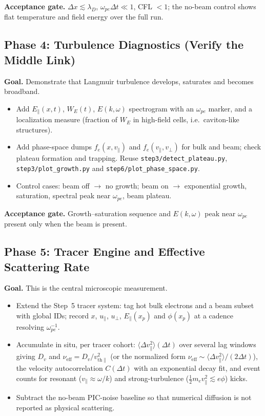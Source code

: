 \documentclass[11pt,a4paper]{article}
\begin{document}
\textbf{Acceptance gate.} $\Delta x\lesssim\lambda_D$, $\omega_{pe}\Delta t\ll1$, CFL $<1$; the
no-beam control shows flat temperature and field energy over the full run.

\subsection{Phase 4: Turbulence Diagnostics (Verify the Middle Link)}

\textbf{Goal.} Demonstrate that Langmuir turbulence develops, saturates and becomes broadband.

\begin{itemize}[leftmargin=*]
  \item Add $E_\parallel(x,t)$, $W_E(t)$, $E(k,\omega)$ spectrogram with an $\omega_{pe}$ marker,
        and a localization measure (fraction of $W_E$ in high-field cells, i.e.\ caviton-like
        structures).
  \item Add phase-space dumps $f_e(x,v_\parallel)$ and $f_e(v_\parallel,v_\perp)$ for bulk and
        beam; check plateau formation and trapping. Reuse \texttt{step3/detect\_plateau.py},
        \texttt{step3/plot\_growth.py} and \texttt{step6/plot\_phase\_space.py}.
  \item Control cases: beam off $\rightarrow$ no growth; beam on $\rightarrow$ exponential growth,
        saturation, spectral peak near $\omega_{pe}$, beam plateau.
\end{itemize}

\textbf{Acceptance gate.} Growth--saturation sequence and $E(k,\omega)$ peak near $\omega_{pe}$
present only when the beam is present.

\subsection{Phase 5: Tracer Engine and Effective Scattering Rate}

\textbf{Goal.} This is the central microscopic measurement.

\begin{itemize}[leftmargin=*]
  \item Extend the Step~5 tracer system: tag hot bulk electrons and a beam subset with global IDs;
        record $x$, $u_\parallel$, $u_\perp$, $E_\parallel(x_p)$ and $\phi(x_p)$ at a cadence
        resolving $\omega_{pe}^{-1}$.
  \item Accumulate in situ, per tracer cohort: $\langle\Delta v_\parallel^2\rangle(\Delta t)$
        over several lag windows giving $D_v$ and $\nu_{\mathrm{eff}}=D_v/v_{\mathrm{th}\parallel}^2$
        (or the normalized form $\nu_{\mathrm{eff}}\sim\langle\Delta v_\parallel^2\rangle/(2\Delta t)$),
        the velocity autocorrelation $C(\Delta t)$ with an exponential decay fit, and event counts
        for resonant ($v_\parallel\approx\omega/k$) and strong-turbulence
        ($\frac12 m_e v_\parallel^2\lesssim e\phi$) kicks.
  \item Subtract the no-beam PIC-noise baseline so that numerical diffusion is not reported as
        physical scattering.
\end{itemize}
\end{document}
